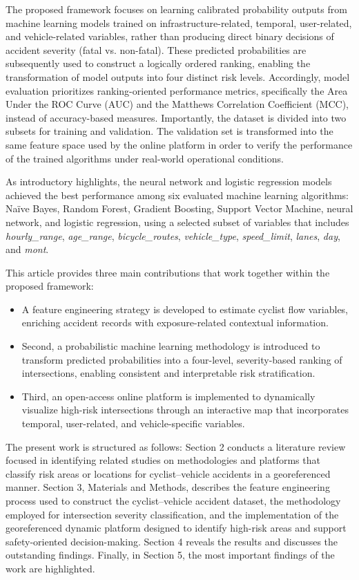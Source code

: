 \documentclass[preprint,12pt]{elsarticle}
\begin{document}
The proposed framework focuses on learning calibrated probability outputs from machine learning models trained on infrastructure-related, temporal, user-related, and vehicle-related variables, rather than producing direct binary decisions of accident severity (fatal vs. non-fatal). These predicted probabilities are subsequently used to construct a logically ordered ranking, enabling the transformation of model outputs into four distinct risk levels. Accordingly, model evaluation prioritizes ranking-oriented performance metrics, specifically the Area Under the ROC Curve (AUC) and the Matthews Correlation Coefficient (MCC), instead of accuracy-based measures. Importantly, the dataset is divided into two subsets for training and validation. The validation set is transformed into the same feature space used by the online platform in order to verify the performance of the trained algorithms under real-world operational conditions.


As introductory highlights, the neural network and logistic regression models achieved the best performance among six evaluated machine learning algorithms: Naïve Bayes, Random Forest, Gradient Boosting, Support Vector Machine, neural network, and logistic regression, using a selected subset of variables that includes  \textit{hourly\_range}, \textit{age\_range}, \textit{bicycle\_routes}, \textit{vehicle\_type}, \textit{speed\_limit}, \textit{lanes}, \textit{day}, and \textit{mont}.

This article provides three main contributions that work together within the proposed framework: 
\begin{itemize}
    \item A feature engineering strategy is developed to estimate cyclist flow variables, enriching accident records with exposure-related contextual information.
    \item Second, a probabilistic machine learning methodology is introduced to transform predicted probabilities into a four-level, severity-based ranking of intersections, enabling consistent and interpretable risk stratification. 
    \item Third, an open-access online platform is implemented to dynamically visualize high-risk intersections through an interactive map that incorporates temporal, user-related, and vehicle-specific variables.
\end{itemize}


The present work is structured as follows: Section 2 conducts a literature review focused in identifying related studies on methodologies and platforms that classify risk areas or locations for cyclist–vehicle accidents in a georeferenced manner. Section 3, Materials and Methods, describes the feature engineering process used to construct the cyclist–vehicle accident dataset, the methodology employed for intersection severity classification, and the implementation of the georeferenced dynamic platform designed to identify high-risk areas and support safety-oriented decision-making. Section 4 reveals the results and discusses the outstanding findings. Finally, in Section 5, the most important findings of the work are highlighted. 
\end{document}
